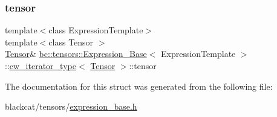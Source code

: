 \mbox{\label{structbc_1_1tensors_1_1Expression__Base_1_1cw__iterator__type_a111bae1235814e66049506ccc1371809}} 
\subsubsection{\texorpdfstring{tensor}{tensor}}
{\footnotesize\ttfamily template$<$class Expression\+Template$>$ \\
template$<$class Tensor $>$ \\
\hyperlink{namespacebc_a659391e47ab612be3ba6c18cf9c89159}{Tensor}\& \hyperlink{classbc_1_1tensors_1_1Expression__Base}{bc\+::tensors\+::\+Expression\+\_\+\+Base}$<$ Expression\+Template $>$\+::\hyperlink{structbc_1_1tensors_1_1Expression__Base_1_1cw__iterator__type}{cw\+\_\+iterator\+\_\+type}$<$ \hyperlink{namespacebc_a659391e47ab612be3ba6c18cf9c89159}{Tensor} $>$\+::tensor}



The documentation for this struct was generated from the following file\+:\begin{DoxyCompactItemize}
\item 
blackcat/tensors/\hyperlink{expression__base_8h}{expression\+\_\+base.\+h}\end{DoxyCompactItemize}
